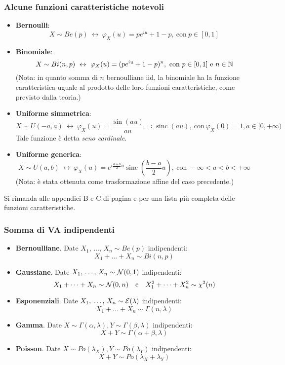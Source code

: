 \subsubsection{Alcune funzioni caratteristiche notevoli}
\begin{itemize}
  \item \textbf{Bernoulli}: 
	$$X \sim Be(p) \ \leftrightarrow \ \varphi_X(u) = p e^{iu} + 1 - p, \ \text{con} \ p \in [0,1]$$
  \item \textbf{Binomiale}: 
	$$X \sim Bi(n,p) \ \leftrightarrow \ \varphi_X(u) = (p e^{iu} + 1 - p)^n, \ \text{con} \ p \in [0,1] \ \text{e} \ n \in \NN$$
  	(Nota: in quanto somma di $n$ bernoulliane iid, la binomiale ha la funzione caratteristica uguale al prodotto delle loro funzioni caratteristiche, come previsto dalla teoria.)
  \item \textbf{Uniforme simmetrica}:
	$$X \sim U(-a,a) \ \leftrightarrow \ \varphi_X(u) = \dfrac{\sin(au)}{au} \eqqcolon \operatorname{sinc}(au), \ \text{con} \ \varphi_X(0) = 1, a \in [0,+\infty)$$
	Tale funzione è detta \emph{seno cardinale}. 
  \item \textbf{Uniforme generica}: 
	$$X \sim U(a,b) \ \leftrightarrow \ \varphi_X(u) = e^{i \frac{a+b}{2} u} \operatorname{sinc} \left( \frac{b-a}{2} u \right), \ \text{con} \ -\infty < a < b < +\infty$$
  	(Nota: è stata ottenuta come trasformazione affine del caso precedente.)
\end{itemize}
Si rimanda alle appendici B e C di pagina \pageref{appendice-discrete} e \pageref{appendice-continue} per una lista più completa delle funzioni caratteristiche.

\subsubsection{Somma di VA indipendenti}
\begin{itemize}
  \item \textbf{Bernoulliane}. Date $X_1, \, \dots, \, X_n \sim Be(p)$ indipendenti:
    $$ X_1 + \dots + X_n \sim Bi(n, p)$$
  \item \textbf{Gaussiane}. Date $X_1, \, \dots, \, X_n \sim \mathcal N(0,1)$ indipendenti:
    $$ X_1 + \dots + X_n \sim \mathcal N(0, n) \quad \text{e} \quad X_1^2 + \dots + X_n^2 \sim \chi^2(n)$$
  \item \textbf{Esponenziali}. Date $X_1, \, \dots, \,  X_n \sim \mathcal E(\lambda)$ indipendenti:
    $$ X_1 + \dots + X_n \sim \Gamma(n, \lambda)$$
  \item \textbf{Gamma}. Date $X \sim \Gamma(\alpha, \lambda), Y \sim \Gamma(\beta, \lambda)$ indipendenti:
    $$ X+Y \sim \Gamma(\alpha + \beta, \lambda)$$
  \item \textbf{Poisson}. Date $X \sim Po(\lambda_X), Y \sim Po(\lambda_Y)$ indipendenti:
    $$ X+Y \sim Po(\lambda_X+\lambda_Y)$$

\end{itemize}
